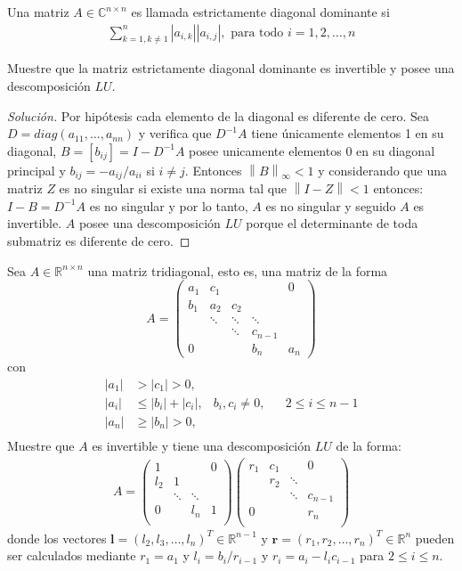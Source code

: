 \documentclass[12pt]{book}
\newcommand{\C}{\mathbb{C}}
\newcommand{\R}{\mathbb{R}}
\newcommand{\todo}{\textrm{ para todo }}
\newcommand\norm[1]{\left\lVert#1\right\rVert}
\newcommand\abs[1]{\left\lvert#1\right\rvert}
\newenvironment{solucion}
  {\renewcommand\qedsymbol{$\square$}\begin{proof}[Solución]}
  {\end{proof}}
\begin{document}
\eje Una matriz $A\in\C^{n\times n}$ es llamada estrictamente diagonal dominante si
\begin{align*}
    \sum_{k=1,k\neq 1}^n\abs{a_{i,k}}\abs{a_{i,j}},\todo i=1,2,\dots,n
\end{align*}

Muestre que la matriz estrictamente diagonal dominante es invertible y posee una descomposición $LU$.
\begin{solucion}
    Por hipótesis cada elemento de la diagonal es diferente de cero. Sea $D=diag(a_{11},\dots,a_{nn})$ y verifica que $D^{-1}A$ tiene únicamente elementos 1 en su diagonal, $B=[b_{ij}]=I-D^{-1}A$ posee unicamente elementos 0 en su diagonal principal y $b_{ij}=-a_{ij}/a_{ii}$ si $i\neq j$. Entonces $\norm{B}_\infty<1$ y considerando que una matriz $Z$ es no singular si existe una norma tal que $\norm{I-Z}<1$ entonces: $I-B=D^{-1}A$ es no singular y por lo tanto, $A$ es no singular y seguido $A$ es invertible. $A$ posee una descomposición $LU$ porque el determinante de toda submatriz es diferente de cero.
\end{solucion}
\eje Sea $A\in\R^{n\times n}$ una matriz tridiagonal, esto es, una matriz de la forma
\[A=\begin{pmatrix}
a_1&c_1&&&0\\
b_1&a_2&c_2\\
&\ddots&\ddots&\ddots&\\
&&\ddots&c_{n-1}\\
0&&&b_n&a_n
\end{pmatrix}\]
con
\begin{align*}
    \abs{a_1}&>\abs{c_1}>0,\\
    \abs{a_i}&\leq\abs{b_i}+\abs{c_i}, & b_i,c_i\neq 0, & & 2\leq i\leq n-1\\
    \abs{a_n}&\geq\abs{b_n}> 0,\\
\end{align*}
Muestre que $A$ es invertible y tiene una descomposición $LU$ de la forma:
\begin{align*}
    A=\begin{pmatrix}
    1   &   &   & 0\\
    l_2 & 1 &   &  \\
        &\ddots &\ddots   &  \\
    0   &   &l_n& 1\\
    \end{pmatrix}\begin{pmatrix}
    r_1   & c_1  &   & 0\\
        & r_2 & \ddots  &  \\
        &       &\ddots   &c_{n-1}  \\
    0   &   &   & r_n\\
    \end{pmatrix}
\end{align*}
donde los vectores $\bm{l}=(l_2,l_3,\dots,l_n)^T\in \R^{n-1}$ y $\bm{r}=(r_1,r_2,\dots,r_n)^T\in \R^n$ pueden ser calculados mediante $r_1=a_1$ y $l_i=b_i/r_{i-1}$ y $r_i=a_i-l_ic_{i-1}$ para $2\leq i \leq n$. 
\end{document}
